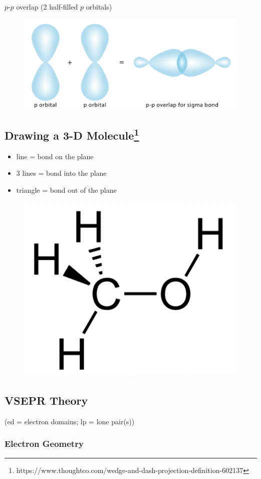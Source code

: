 \documentclass[a4paper, 12pt]{article}
\begin{document}
\begin{center}
    $p$-$p$ overlap (2 half-filled $p$ orbitals)
\end{center}

\begin{figure}[ht]
    \centering
    \includegraphics[width=0.45\linewidth]{ppoverlap.png}
    \label{fig:erm}
\end{figure}

\subsection*{Drawing a 3-D Molecule\footnote{https://www.thoughtco.com/wedge-and-dash-projection-definition-602137}}

\begin{itemize}[leftmargin=*, nosep]
    \item line = bond on the plane
    \item 3 lines = bond into the plane
    \item triangle = bond out of the plane
\end{itemize}

\begin{figure}[ht]
    \centering
    \includegraphics[width=0.4\linewidth]{3dmol.png}
    \label{fig:312456738r902po3iu4}
\end{figure}

\subsection*{VSEPR Theory}
(ed = electron domains; lp = lone pair(s))
\subsubsection*{Electron Geometry}
\end{document}
